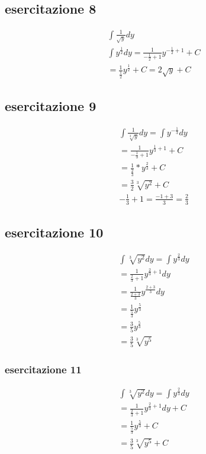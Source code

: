 \subsection{esercitazione 8}
	\begin{equation}
		\begin{matrix}
			\int \frac{1}{\sqrt{y}}dy\\
			\int
			y^{\frac{1}{2}}dy=\frac{1}{-\frac{1}{2}+1}y^{-\frac{1}{2}+1}+C\\
			=\frac{1}{\frac{1}{2}}y^\frac{1}{2}+C=2\sqrt{y}+C
		\end{matrix}
	\end{equation}
\subsection{esercitazione 9}
	\begin{equation}
		\begin{matrix}
			\int \frac{1}{\sqrt[3]{y}}dy=\int y^{-\frac{1}{3}}dy\\
			=\frac{1}{-\frac{1}{3}+1}y^{\frac{1}{3}+1}+C\\
			=\frac{1}{\frac{2}{3}}*y^{\frac{2}{3}}+C\\
			=\frac{3}{2}\sqrt[3]{y^2}+C\\
			-\frac{1}{3}+1=\frac{-1+3}{3}=\frac{2}{3}
		\end{matrix}
	\end{equation}
\subsection{esercitazione 10}
	\begin{equation}
		\begin{matrix}
			\int \sqrt[3]{y^2}dy=\int y^{\frac{2}{3}}dy\\
			=\frac{1}{\frac{2}{3}+1}y^{\frac{2}{3}+1}dy\\
			=\frac{1}{\frac{2+3}{3}}y^{\frac{2+3}{3}}dy\\
			=\frac{1}{\frac{5}{3}}y^{\frac{5}{3}}\\
			=\frac{3}{5}y^\frac{5}{3}\\
			=\frac{3}{5}\sqrt[3]{y^5}
		\end{matrix}
	\end{equation}
\subsubsection{esercitazione 11}
	\begin{equation}
		\begin{matrix}
			\int \sqrt[3]{y^2}dy=\int
			y^{\frac{2}{3}}dy\\
			=\frac{1}{\frac{2}{3}+1}y^{\frac{2}{3}+1}dy+C\\
			=\frac{1}{\frac{5}{3}}y^{\frac{5}{3}}+C\\
			=\frac{3}{5}\sqrt[3]{y^5}+C
		\end{matrix}
	\end{equation}





